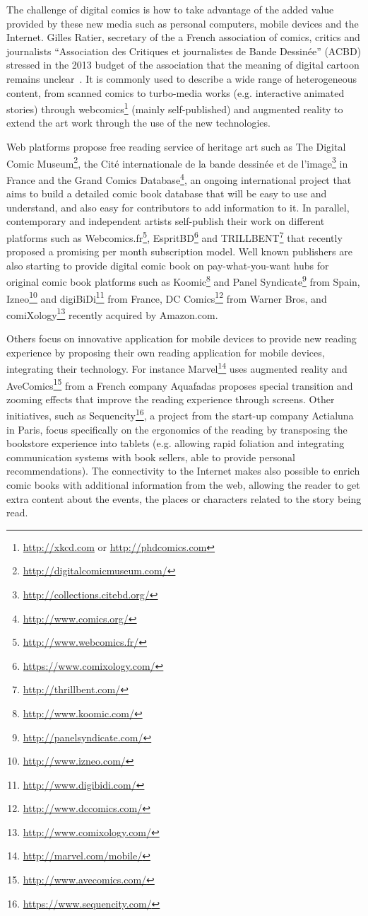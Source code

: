 The challenge of digital comics is how to take advantage of the added value provided by these new media such as personal computers, mobile devices and the Internet.
Gilles Ratier, secretary of the a French association of comics, critics and journalists ``Association des Critiques et journalistes de Bande Dessin\'{e}e'' (ACBD) stressed in the 2013 budget of the association that the meaning of digital cartoon remains unclear~\cite{Ratier2013}.
It is commonly used to describe a wide range of heterogeneous content, from scanned comics to turbo-media works (e.g. interactive animated stories) through webcomics\footnote{\url{http://xkcd.com} or \url{http://phdcomics.com}} (mainly self-published) and augmented reality to extend the art work through the use of the new technologies.

Web platforms propose free reading service of heritage art such as The Digital Comic Museum\footnote{\url{http://digitalcomicmuseum.com/}}, the Cit\'{e} internationale de la bande dessin\'{e}e et de l'image\footnote{\url{http://collections.citebd.org/}} in France and the Grand Comics Database\footnote{\url{http://www.comics.org/}}, an ongoing international project that aims to build a detailed comic book database that will be easy to use and understand, and also easy for contributors to add information to it.
In parallel, contemporary and independent artists self-publish their work on different platforms such as Webcomics.fr\footnote{\url{http://www.webcomics.fr/}}, EspritBD\footnote{\url{https://www.comixology.com/}} and TRILLBENT\footnote{\url{http://thrillbent.com/}} that recently proposed a promising per month subscription model.
Well known publishers are also starting to provide digital comic book on pay-what-you-want hubs for original comic book platforms such as Koomic\footnote{\url{http://www.koomic.com/}} and Panel Syndicate\footnote{\url{http://panelsyndicate.com/}} from Spain, Izneo\footnote{\url{http://www.izneo.com/}} and digiBiDi\footnote{\url{http://www.digibidi.com/}} from France, DC Comics\footnote{\url{http://www.dccomics.com/}} from Warner Bros, and comiXology\footnote{\url{http://www.comixology.com/}} recently acquired by Amazon.com.

Others focus on innovative application for mobile devices to provide new reading experience by proposing their own reading application for mobile devices, integrating their technology.
For instance Marvel\footnote{\url{http://marvel.com/mobile/}} uses augmented reality and AveComics\footnote{\url{http://www.avecomics.com/}} from a French company Aquafadas proposes special transition and zooming effects that improve the reading experience through screens.
Other initiatives, such as Sequencity\footnote{\url{https://www.sequencity.com/}}, a project from the start-up company Actialuna in Paris, focus specifically on the ergonomics of the reading by transposing the bookstore experience into tablets (e.g. allowing rapid foliation and integrating communication systems with book sellers, able to provide personal recommendations).
The connectivity to the Internet makes also possible to enrich comic books with additional information from the web,
allowing the reader to get extra content about the events, the places or characters related to the story being read.

